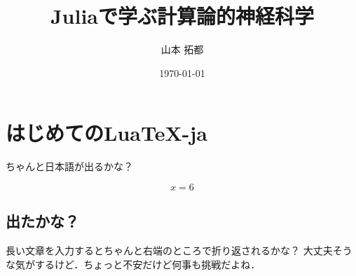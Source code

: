 \documentclass[tombow, paper={182truemm, 232truemm}, titlepage]{ltjsbook}
\title{\Huge \textbf{Juliaで学ぶ計算論的神経科学}}
\author{\huge 山本 拓都}
\date{\huge \today}
\begin{document}
 
\maketitle

\section{はじめてのLua\TeX-ja}
ちゃんと日本語が出るかな？

$$
x = 6
$$



\subsection{出たかな？}
長い文章を入力するとちゃんと右端のところで折り返されるかな？
大丈夫そうな気がするけど．ちょっと不安だけど何事も挑戦だよね．
\end{document}
